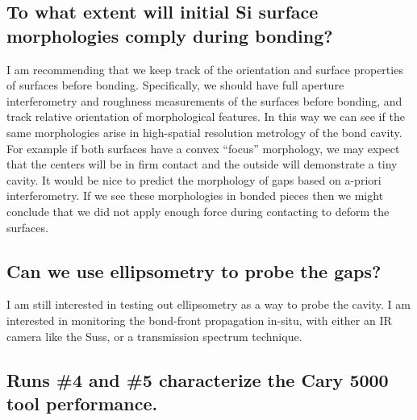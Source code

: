 \subsection{To what extent will initial Si surface morphologies comply during bonding?}
I am recommending that we keep track of the orientation and surface properties of surfaces before bonding.  Specifically, we should have full aperture interferometry and roughness measurements of the surfaces before bonding, and track relative orientation of morphological features.  In this way we can see if the same morphologies arise in high-spatial resolution metrology of the bond cavity.  For example if both surfaces have a convex ``focus'' morphology, we may expect that the centers will be in firm contact and the outside will demonstrate a tiny cavity.  It would be nice to predict the morphology of gaps based on a-priori interferometry.  If we see these morphologies in bonded pieces then we might conclude that we did not apply enough force during contacting to deform the surfaces.  

\subsection{Can we use ellipsometry to probe the gaps?}
I am still interested in testing out ellipsometry as a way to probe the cavity.  I am interested in monitoring the bond-front propagation in-situ, with either an IR camera like the Suss, or a transmission spectrum technique.

\subsection{Runs \#4 and \#5 characterize the Cary 5000 tool performance.}

